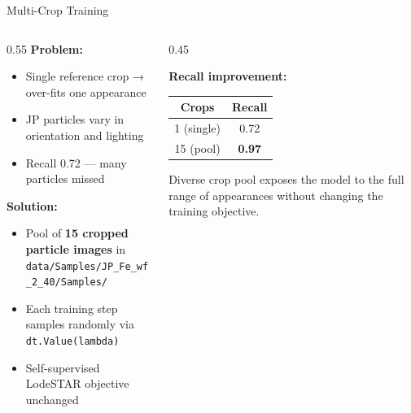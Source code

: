 \begin{frame}{Multi-Crop Training}
\begin{columns}
\begin{column}{0.55\textwidth}
\textbf{Problem:}
\begin{itemize}\small
    \item Single reference crop → over-fits one appearance
    \item JP particles vary in orientation and lighting
    \item Recall 0.72 — many particles missed
\end{itemize}
\smallskip
\textbf{Solution:}
\begin{itemize}\small
    \item Pool of \textbf{15 cropped particle images} in\\
          \texttt{data/Samples/JP\_Fe\_wf\_2\_40/Samples/}
    \item Each training step samples randomly via \texttt{dt.Value(lambda)}
    \item Self-supervised LodeSTAR objective unchanged
\end{itemize}
\end{column}
\begin{column}{0.45\textwidth}
\begin{center}
\small\textbf{Recall improvement:}\\[0.3cm]
\begin{tabular}{|c|c|}
\hline
\textbf{Crops} & \textbf{Recall} \\
\hline
1 (single) & 0.72 \\
\hline
15 (pool)  & \textbf{0.97} \\
\hline
\end{tabular}
\end{center}
\smallskip
\begin{mynote}
\small Diverse crop pool exposes the model to the full range of appearances without changing the training objective.
\end{mynote}
\end{column}
\end{columns}
\end{frame}

